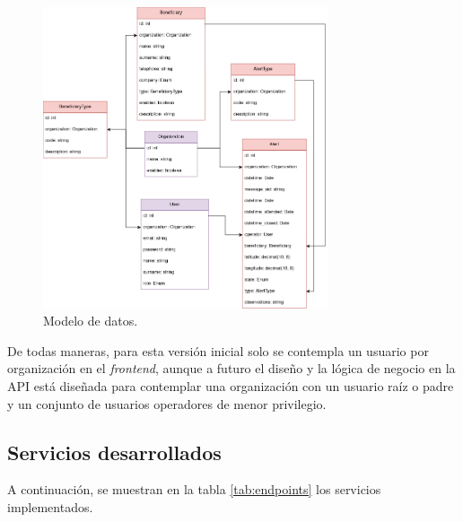 \begin{figure}[H]
	\centering
	\includegraphics[width=0.75\textwidth]{./Figures/backend-modelos.png}
	\caption{Modelo de datos.}
	\label{backend:modelo}
\end{figure}


De todas maneras, para esta versión inicial solo se contempla un usuario por organización en el \textit{frontend}, aunque a futuro el diseño y la lógica de negocio en la API está diseñada para contemplar una organización con un usuario raíz o padre y un conjunto de usuarios operadores de menor privilegio.

\subsection{Servicios desarrollados}

A continuación, se muestran en la tabla \ref{tab:endpoints} los servicios implementados.


